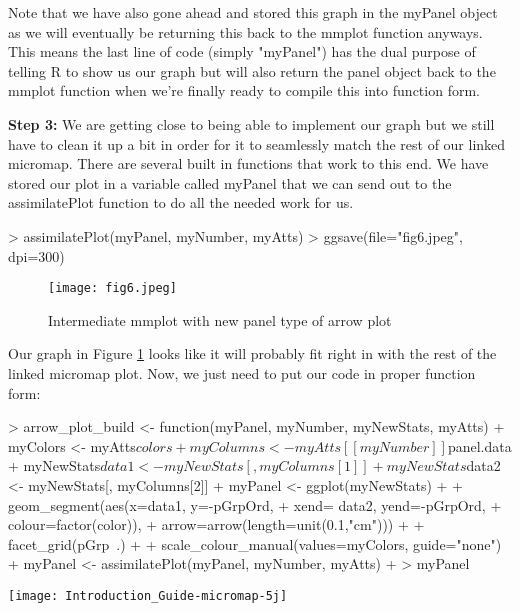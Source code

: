 \documentclass{article}
\begin{document}
Note that we have also gone ahead and stored this graph in the myPanel object as we will eventually be returning this back to the mmplot function anyways. This means the last line of code (simply "myPanel") has the dual purpose of telling R to show us our graph but will also return the panel object back to the mmplot function when we're finally ready to compile this into function form.

\textbf{Step 3:} We are getting close to being able to implement our graph but we still have to clean it up a bit in order for it to seamlessly match the rest of our linked micromap. There are several built in functions that work to this end. We have stored our plot in a variable called myPanel that we can send out to the assimilatePlot function to do all the needed work for us.

\begin{Schunk}
\begin{Sinput}
> assimilatePlot(myPanel, myNumber, myAtts)
> ggsave(file="fig6.jpeg", dpi=300)
\end{Sinput}
\end{Schunk}

\begin{figure}
\begin{center}
\texttt{[image: fig6.jpeg]} 
  \caption{Intermediate mmplot with new panel type of arrow plot} 
  \label{fig6}
\end{center}
\end{figure}

Our graph in Figure \ref{fig6} looks like it will probably fit right in with the rest of the linked micromap plot. Now, we just need to put our code in proper function form:

\begin{Schunk}
\begin{Sinput}
> arrow_plot_build <- function(myPanel, myNumber, myNewStats, myAtts){
+   myColors <- myAtts$colors
+   myColumns <- myAtts[[myNumber]]$panel.data
+   myNewStats$data1 <- myNewStats[, myColumns[1]]
+   myNewStats$data2 <- myNewStats[, myColumns[2]]
+   myPanel <- ggplot(myNewStats) +
+   geom_segment(aes(x=data1, y=-pGrpOrd,
+   xend= data2, yend=-pGrpOrd,
+   colour=factor(color)),
+   arrow=arrow(length=unit(0.1,"cm"))) +
+   facet_grid(pGrp~.) +
+   scale_colour_manual(values=myColors, guide="none")
+   myPanel <- assimilatePlot(myPanel, myNumber, myAtts)
+   }
> myPanel
\end{Sinput}
\end{Schunk}
\texttt{[image: Introduction\_Guide-micromap-5j]}
\end{document}
